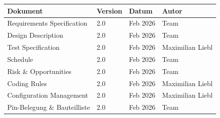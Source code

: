\documentclass[a4paper,11pt]{article}
\begin{document}
\begin{longtable}{p{5cm} p{2cm} p{3cm} p{3cm}}
\toprule
\rowcolor{tableheader}
\textbf{Dokument} & \textbf{Version} & \textbf{Datum} & \textbf{Autor} \\
\midrule
\endhead
Requirements Specification   & 2.0 & Feb 2026 & Team \\
Design Description           & 2.0 & Feb 2026 & Team \\
Test Specification           & 2.0 & Feb 2026 & Maximilian Liebl \\
Schedule                     & 2.0 & Feb 2026 & Team \\
Risk \& Opportunities        & 2.0 & Feb 2026 & Team \\
Coding Rules                 & 2.0 & Feb 2026 & Maximilian Liebl \\
Configuration Management     & 2.0 & Feb 2026 & Maximilian Liebl \\
Pin-Belegung \& Bauteilliste & 2.0 & Feb 2026 & Team \\
\bottomrule
\end{longtable}
\end{document}
